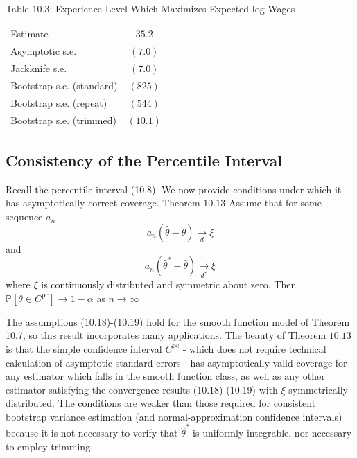 \documentclass[10pt]{article}
\begin{document}
Table 10.3: Experience Level Which Maximizes Expected log Wages

\begin{tabular}{lc}
\hline\hline
Estimate & $35.2$ \\
Asymptotic s.e. & $(7.0)$ \\
Jackknife s.e. & $(7.0)$ \\
Bootstrap s.e. (standard) & $(825)$ \\
Bootstrap s.e. (repeat) & $(544)$ \\
Bootstrap s.e. (trimmed) & $(10.1)$ \\
\hline
\end{tabular}

\subsection{Consistency of the Percentile Interval}
Recall the percentile interval (10.8). We now provide conditions under which it has asymptotically correct coverage. Theorem $10.13$ Assume that for some sequence $a_{n}$
$$
a_{n}(\widehat{\theta}-\theta) \underset{d}{\longrightarrow} \xi
$$
and
$$
a_{n}\left(\widehat{\theta}^{*}-\widehat{\theta}\right) \underset{d^{*}}{\longrightarrow} \xi
$$
where $\xi$ is continuously distributed and symmetric about zero. Then $\mathbb{P}\left[\theta \in C^{\mathrm{pc}}\right] \rightarrow 1-\alpha$ as $n \rightarrow \infty$

The assumptions (10.18)-(10.19) hold for the smooth function model of Theorem 10.7, so this result incorporates many applications. The beauty of Theorem $10.13$ is that the simple confidence interval $C^{\mathrm{pc}}$ - which does not require technical calculation of asymptotic standard errors - has asymptotically valid coverage for any estimator which falls in the smooth function class, as well as any other estimator satisfying the convergence results (10.18)-(10.19) with $\xi$ symmetrically distributed. The conditions are weaker than those required for consistent bootstrap variance estimation (and normal-approximation confidence intervals) because it is not necessary to verify that $\widehat{\theta}^{*}$ is uniformly integrable, nor necessary to employ trimming.
\end{document}
